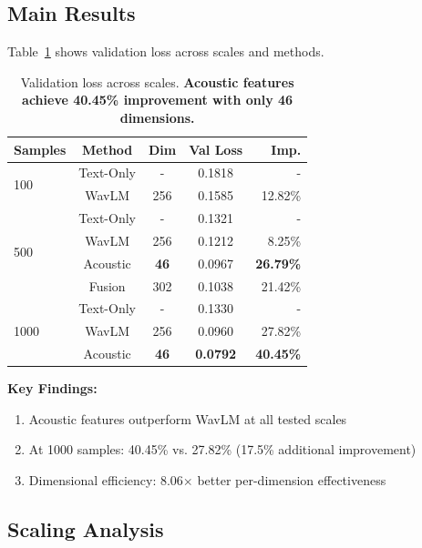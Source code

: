 
\subsection{Main Results}
\label{subsec:main_results}

Table~\ref{tab:main_results} shows validation loss across scales and methods.

\begin{table}[t]
\centering
\small
\begin{tabular}{lcccr}
\toprule
\textbf{Samples} & \textbf{Method} & \textbf{Dim} & \textbf{Val Loss} & \textbf{Imp.} \\
\midrule
\multirow{2}{*}{100}
  & Text-Only & - & 0.1818 & - \\
  & WavLM & 256 & 0.1585 & 12.82\% \\
\midrule
\multirow{4}{*}{500}
  & Text-Only & - & 0.1321 & - \\
  & WavLM & 256 & 0.1212 & 8.25\% \\
  & Acoustic & \textbf{46} & 0.0967 & \textbf{26.79\%} \\
  & Fusion & 302 & 0.1038 & 21.42\% \\
\midrule
\multirow{3}{*}{1000}
  & Text-Only & - & 0.1330 & - \\
  & WavLM & 256 & 0.0960 & 27.82\% \\
  & Acoustic & \textbf{46} & \textbf{0.0792} & \textbf{40.45\%} \\
\bottomrule
\end{tabular}
\caption{Validation loss across scales. \textbf{Acoustic features achieve 40.45\% improvement with only 46 dimensions.}}
\label{tab:main_results}
\end{table}

\textbf{Key Findings:}
\begin{enumerate}
    \item Acoustic features outperform WavLM at all tested scales
    \item At 1000 samples: 40.45\% vs. 27.82\% (17.5\% additional improvement)
    \item Dimensional efficiency: 8.06$\times$ better per-dimension effectiveness
\end{enumerate}

\subsection{Scaling Analysis}
\label{subsec:scaling}

